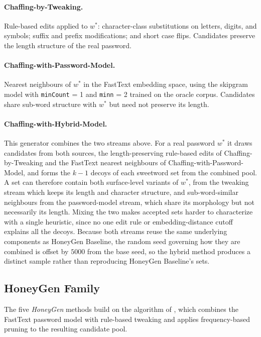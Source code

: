 \paragraph{Chaffing-by-Tweaking.}
Rule-based edits applied to $w^{*}$: character-class substitutions on
letters, digits, and symbols; suffix and prefix modifications; and short
case flips. Candidates preserve the length structure of the real
password.

\paragraph{Chaffing-with-Password-Model.}
Nearest neighbours of $w^{*}$ in the FastText embedding space, using the
skipgram model with \texttt{minCount} = 1 and \texttt{minn} = 2 trained
on the oracle corpus. Candidates share sub-word structure with $w^{*}$
but need not preserve its length.

\paragraph{Chaffing-with-Hybrid-Model.}
This generator combines the two streams above. For a real password
$w^{*}$ it draws candidates from both sources, the length-preserving
rule-based edits of Chaffing-by-Tweaking and the FastText nearest
neighbours of Chaffing-with-Password-Model, and forms the $k-1$ decoys
of each sweetword set from the combined pool. A set can therefore
contain both surface-level variants of $w^{*}$, from the tweaking stream
which keeps its length and character structure, and sub-word-similar
neighbours from the password-model stream, which share its morphology
but not necessarily its length. Mixing the two makes accepted sets
harder to characterize with a single heuristic, since no one edit rule
or embedding-distance cutoff explains all the decoys. Because both
streams reuse the same underlying components as HoneyGen Baseline, the
random seed governing how they are combined is offset by $5000$ from the
base seed, so the hybrid method produces a distinct sample rather than
reproducing HoneyGen Baseline's sets.

\subsection{HoneyGen Family}
\label{subsec:method-honeygen}

The five \emph{HoneyGen} methods build on the algorithm of
\textcite{dionysiou2021honeygen}, which combines the FastText password
model with rule-based tweaking and applies frequency-based pruning to
the resulting candidate pool.

